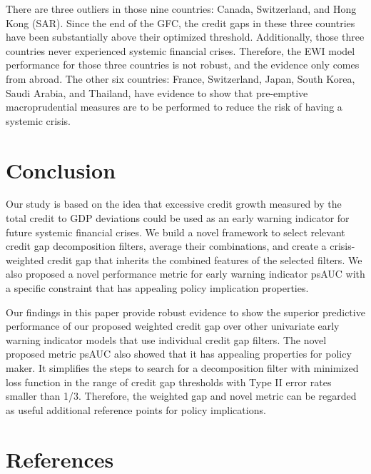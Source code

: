 \documentclass[
  12pt,
]{article}
\begin{document}
There are three outliers in those nine countries: Canada, Switzerland, and Hong Kong (SAR). Since the end of the GFC, the credit gaps in these three countries have been substantially above their optimized threshold. Additionally, those three countries never experienced systemic financial crises. Therefore, the EWI model performance for those three countries is not robust, and the evidence only comes from abroad. The other six countries: France, Switzerland, Japan, South Korea, Saudi Arabia, and Thailand, have evidence to show that pre-emptive macroprudential measures are to be performed to reduce the risk of having a systemic crisis.

\hypertarget{conclusion}{%
\section{Conclusion}\label{conclusion}}

Our study is based on the idea that excessive credit growth measured by the total credit to GDP deviations could be used as an early warning indicator for future systemic financial crises. We build a novel framework to select relevant credit gap decomposition filters, average their combinations, and create a crisis-weighted credit gap that inherits the combined features of the selected filters. We also proposed a novel performance metric for early warning indicator psAUC with a specific constraint that has appealing policy implication properties.

Our findings in this paper provide robust evidence to show the superior predictive performance of our proposed weighted credit gap over other univariate early warning indicator models that use individual credit gap filters. The novel proposed metric psAUC also showed that it has appealing properties for policy maker. It simplifies the steps to search for a decomposition filter with minimized loss function in the range of credit gap thresholds with Type II error rates smaller than 1/3. Therefore, the weighted gap and novel metric can be regarded as useful additional reference points for policy implications.

\clearpage

\hypertarget{references}{%
\section*{References}\label{references}}
\end{document}
